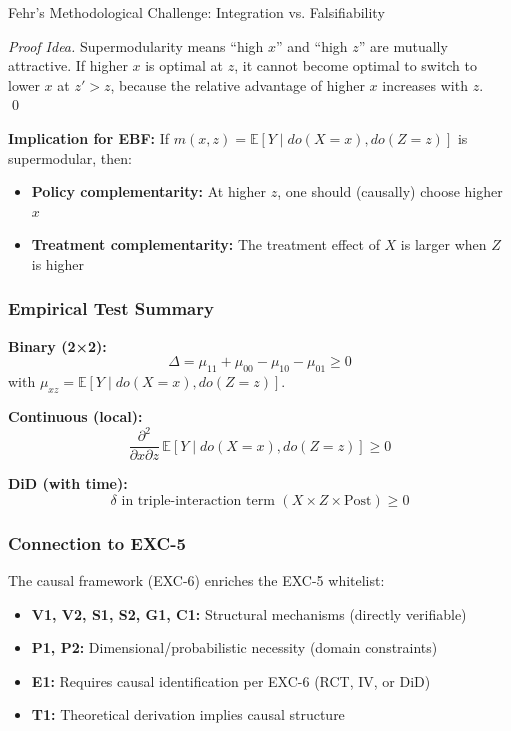 \begin{chapter}{Fehr's Methodological Challenge: Integration vs. Falsifiability}
\begin{proof}[Proof Idea]
Supermodularity means ``high $x$'' and ``high $z$'' are mutually attractive. If higher $x$ is optimal at $z$, it cannot become optimal to switch to lower $x$ at $z' > z$, because the relative advantage of higher $x$ increases with $z$. \qed
\end{proof}

\textbf{Implication for EBF:} If $m(x,z) = \mathbb{E}[Y \mid do(X=x), do(Z=z)]$ is supermodular, then:
\begin{itemize}[noitemsep]
    \item \textbf{Policy complementarity:} At higher $z$, one should (causally) choose higher $x$
    \item \textbf{Treatment complementarity:} The treatment effect of $X$ is larger when $Z$ is higher
\end{itemize}

\subsubsection{Empirical Test Summary}

\begin{tcolorbox}[colback=green!5!white,colframe=green!75!black,title=Causal Complementarity: Test Formulas]
\textbf{Binary (2×2):}
\begin{equation}
\Delta = \mu_{11} + \mu_{00} - \mu_{10} - \mu_{01} \geq 0
\end{equation}
with $\mu_{xz} = \mathbb{E}[Y \mid do(X=x), do(Z=z)]$.

\textbf{Continuous (local):}
\begin{equation}
\frac{\partial^2}{\partial x \partial z}\, \mathbb{E}[Y \mid do(X=x), do(Z=z)] \geq 0
\end{equation}

\textbf{DiD (with time):}
\begin{equation}
\delta \text{ in triple-interaction term } (X \times Z \times \text{Post}) \geq 0
\end{equation}
\end{tcolorbox}

\subsubsection{Connection to EXC-5}

The causal framework (EXC-6) enriches the EXC-5 whitelist:
\begin{itemize}[noitemsep]
    \item \textbf{V1, V2, S1, S2, G1, C1:} Structural mechanisms (directly verifiable)
    \item \textbf{P1, P2:} Dimensional/probabilistic necessity (domain constraints)
    \item \textbf{E1:} Requires causal identification per EXC-6 (RCT, IV, or DiD)
    \item \textbf{T1:} Theoretical derivation implies causal structure
\end{itemize}


\end{chapter}
